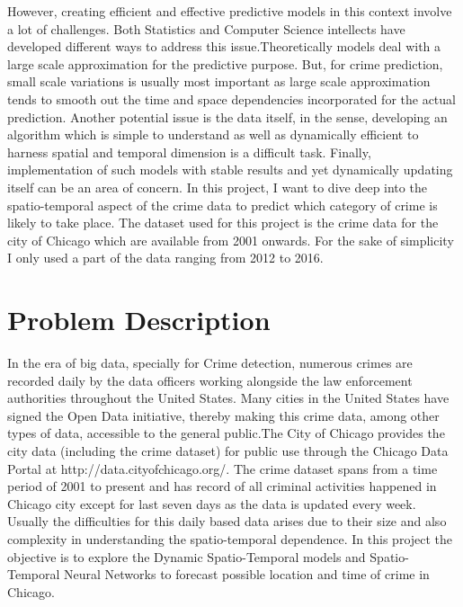 \documentclass[conference]{IEEEtran}
\begin{document}
However, creating efficient and effective predictive models in this context involve a lot of challenges. Both Statistics and Computer Science intellects have developed different ways to address this issue.Theoretically models  deal with a large scale approximation for the predictive purpose. But, for crime prediction, small scale variations is usually most important as  large scale approximation tends to smooth out the time and space dependencies incorporated for the actual prediction\cite{b1}. Another potential issue is the data itself, in the sense, developing an algorithm which is simple to understand as well as dynamically efficient to harness spatial and temporal dimension is a difficult task. Finally, implementation of such models with stable results and yet dynamically updating itself can be an area of concern. In this project, I want to dive deep into the spatio-temporal aspect of the crime data to predict which category of crime is likely to take place. The dataset  used for this project is the crime data for the city of Chicago which are available from 2001 onwards. For the sake of simplicity I only used a part of the data ranging from 2012 to 2016. \\   

\section{Problem Description}

 In the era of big data, specially for Crime detection, numerous crimes are recorded daily by the data officers working alongside the law enforcement authorities throughout the United States. Many cities in the United States have signed the Open Data initiative, thereby making this crime data, among other types of data, accessible to the general public.The City of Chicago provides the city data (including the crime dataset) for public use through the Chicago Data Portal at http://data.cityofchicago.org/. The crime dataset spans from a time period of 2001 to present and has record of all criminal activities happened in Chicago city except for last seven days as the data is updated every week. Usually the difficulties for this daily based data arises due to their size and also complexity in understanding the spatio-temporal dependence. In this project the objective is to explore the Dynamic Spatio-Temporal models and Spatio-Temporal Neural Networks to forecast possible location and time of crime in Chicago.\\
 
\end{document}
